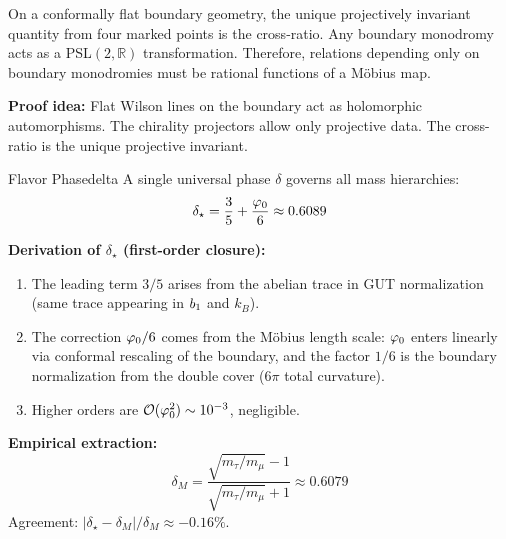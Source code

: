 \begin{tcolorbox}[colback=purple!3, colframe=purple!50!black, 
    title={\textbf{Lemma (Cross-Ratio from Boundary Monodromy)}}, fonttitle=\bfseries\small]
On a conformally flat boundary geometry, the unique projectively invariant quantity 
from four marked points is the cross-ratio. Any boundary monodromy acts as a 
PSL$(2,\mathbb{R})$ transformation. Therefore, relations depending only on boundary 
monodromies must be rational functions of a M\"obius map.

\textbf{Proof idea:} Flat Wilson lines on the boundary act as holomorphic automorphisms. 
The chirality projectors allow only projective data. The cross-ratio is the unique 
projective invariant.
\end{tcolorbox}

\begin{definition}{Flavor Phase}{delta}
A single universal phase $\delta$ governs all mass hierarchies:
\begin{equation}
    \delta_\star = \frac{3}{5} + \frac{\varphi_0}{6} \approx 0.6089
\end{equation}

\textbf{Derivation of $\delta_\star$ (first-order closure):}
\begin{enumerate}[leftmargin=1.5em, topsep=2pt, itemsep=1pt]
    \item The leading term $3/5$ arises from the abelian trace in GUT normalization 
        (same trace appearing in $b_1$ and $k_B$).
    \item The correction $\varphi_0/6$ comes from the M\"obius length scale: $\varphi_0$ 
        enters linearly via conformal rescaling of the boundary, and the factor 
        $1/6$ is the boundary normalization from the double cover ($6\pi$ total curvature).
    \item Higher orders are $\mathcal{O}(\varphi_0^2) \sim 10^{-3}$, negligible.
\end{enumerate}

\textbf{Empirical extraction:}
\begin{equation}
    \delta_M = \frac{\sqrt{m_\tau/m_\mu} - 1}{\sqrt{m_\tau/m_\mu} + 1} \approx 0.6079
\end{equation}
Agreement: $|\delta_\star - \delta_M| / \delta_M \approx -0.16\%$.
\end{definition}

